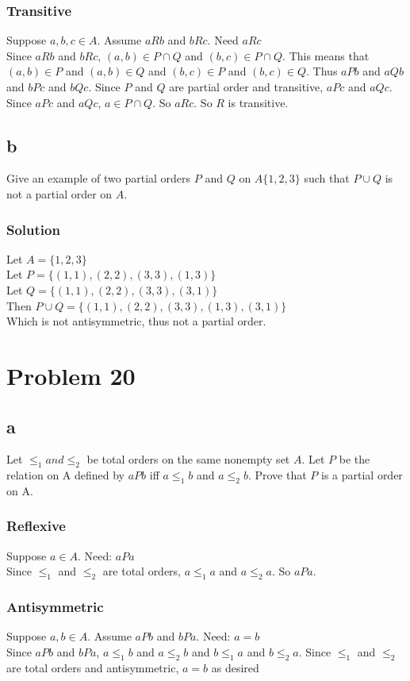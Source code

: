 \documentclass{article}
\begin{document}
\subsubsection*{Transitive}
Suppose $a,b,c \in A$.
Assume $aRb$ and $bRc$.
Need $aRc$\\
Since $aRb$ and $bRc$, $(a,b) \in P \cap Q$ and $(b,c) \in P \cap Q$. This means that $(a,b) \in P$ and $(a,b) \in Q$ and $(b,c) \in P$ and $(b,c) \in Q$. Thus $aPb$ and $aQb$ and $bPc$ and $bQc$. Since $P$ and $Q$ are partial order and transitive, $aPc$ and $aQc$. Since $aPc$ and $aQc$, $a \in P \cap Q$. So $aRc$. So $R$ is transitive.\\

\subsection*{b}
Give an example of two partial orders $P$ and $Q$ on $A \{1,2,3 \}$ such that $P \cup Q$ is not a partial order on $A$.\\
\subsubsection*{Solution}
Let $A = \{1,2,3\}$\\
Let $P = \{ (1,1), (2,2), (3,3), (1,3) \}$\\
Let $Q = \{ (1,1), (2,2), (3,3), (3,1) \}$\\
Then $P \cup Q = \{ (1,1), (2,2), (3,3), (1,3), (3,1) \}$\\
Which is not antisymmetric, thus not a partial order.\\


\section*{Problem 20}
\subsection*{a}
Let $\leq_1 and\leq_2$ be total orders on the same nonempty set $A$. Let $P$ be the relation on A defined by $aPb$ iff $a\leq_1 b$ and $a\leq_2 b$. Prove that $P$ is a partial order on A.
\subsubsection*{Reflexive}
Suppose $a \in A$.
Need: $aPa$\\
Since $\leq_1$ and $\leq_2$ are total orders, $a\leq_1 a$ and $a\leq_2 a$. So $aPa$.
\subsubsection*{Antisymmetric}
Suppose $a,b \in A$.
Assume $aPb$ and $bPa$.
Need: $a = b$\\
Since $aPb$ and $bPa$, $a\leq_1 b$ and $a\leq_2 b$ and $b\leq_1 a$ and $b\leq_2 a$. Since $\leq_1$ and $\leq_2$ are total orders and antisymmetric, $a = b$ as desired
\end{document}
